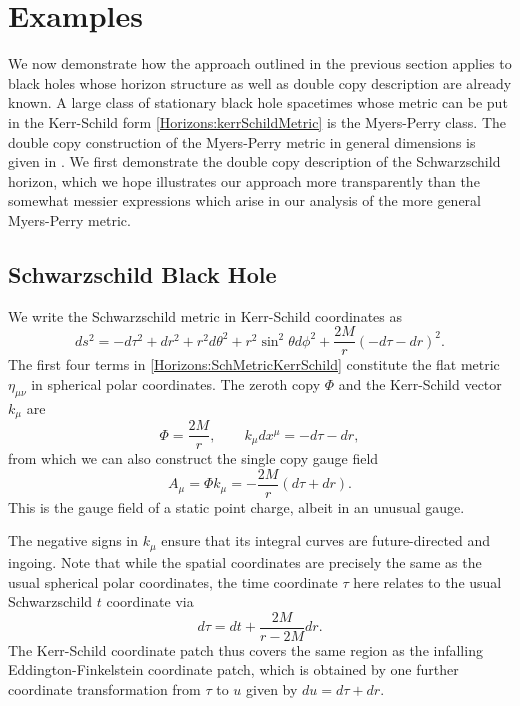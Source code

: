 \section{Examples} \label{Horizons:sec:examples}
We now demonstrate how the approach outlined in the previous section applies to black holes whose horizon structure
as well as double copy description are already known. A large class of stationary black hole spacetimes whose metric can be put in the Kerr-Schild form
\eqref{Horizons:kerrSchildMetric} is the Myers-Perry class. The double copy construction of the Myers-Perry metric in
general dimensions is given in \cite{Monteiro:2014cda}. We first demonstrate the double copy description of the
Schwarzschild horizon, which we hope illustrates our approach more transparently than the somewhat messier
expressions which arise in our analysis of the more general Myers-Perry metric.

\subsection{Schwarzschild Black Hole}
We write the Schwarzschild metric in Kerr-Schild coordinates as
\begin{equation} \label{Horizons:SchMetricKerrSchild} 
    ds^{2} = -d\tau^{2} + dr^{2} + r^{2}d\theta^{2} + r^{2}\sin^{2}\theta d\phi^{2} + \frac{2M}{r} \left(-d\tau
    - dr\right)^{2}.
\end{equation}
The first four terms in \eqref{Horizons:SchMetricKerrSchild} constitute the flat metric $\eta_{\mu \nu}$ in spherical polar
coordinates. The zeroth copy $\Phi$ and the Kerr-Schild vector $k_{\mu}$ are
\begin{equation}  
    \Phi = \frac{2M}{r}, \qquad k_{\mu} dx^{\mu} = -d\tau - dr,
\end{equation}
from which we can also construct the single copy gauge field
\begin{equation}  
    A_{\mu} = \Phi k_{\mu} = -\frac{2M}{r} \left(d\tau + dr\right).
\end{equation}
This is the gauge field of a static point charge, albeit in an unusual gauge.

The negative signs in $k_{\mu}$ ensure that its integral curves are future-directed and ingoing. Note that while
the spatial coordinates are precisely the same as the usual spherical polar coordinates, the time coordinate $\tau$
here relates to the usual Schwarzschild $t$ coordinate via
\begin{equation}  
    d\tau = dt + \frac{2M}{r - 2M} dr.
\end{equation}
The Kerr-Schild coordinate patch thus covers the same region as the infalling Eddington-Finkelstein coordinate
patch, which is obtained by one further coordinate transformation from $\tau$ to $u$ given by $du = d\tau + dr$.

